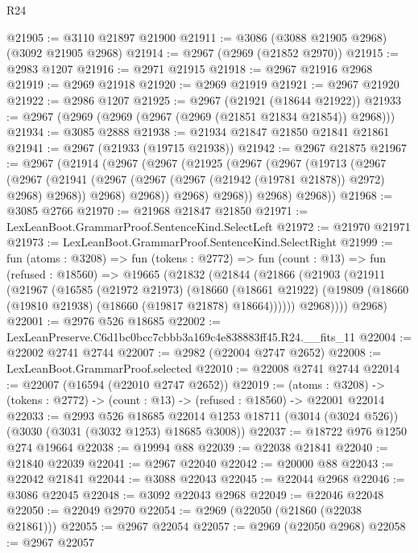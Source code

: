 \begin{lexlean}{R24}
\begin{coremodule}
@21905 := @3110 @21897 @21900
@21911 := @3086 (@3088 @21905 @2968) (@3092 @21905 @2968)
@21914 := @2967 (@2969 (@21852 @2970))
@21915 := @2983 @1207
@21916 := @2971 @21915
@21918 := @2967 @21916 @2968
@21919 := @2969 @21918
@21920 := @2969 @21919
@21921 := @2967 @21920
@21922 := @2986 @1207
@21925 := @2967 (@21921 (@18644 @21922))
@21933 := @2967 (@2969 (@2969 (@2967 (@2969 (@21851 @21834 @21854)) @2968)))
@21934 := @3085 @2888
@21938 := @21934 @21847 @21850 @21841 @21861
@21941 := @2967 (@21933 (@19715 @21938))
@21942 := @2967 @21875
@21967 := @2967
    (@21914
      (@2967
        (@2967
          (@21925
            (@2967
              (@2967
                (@19713
                  (@2967
                    (@2967
                      (@21941 (@2967 (@2967 (@2967 (@21942 (@19781 @21878)) @2972) @2968) @2968))
                      @2968)
                    @2968))
                @2968)
              @2968))
          @2968)
        @2968))
@21968 := @3085 @2766
@21970 := @21968 @21847 @21850
@21971 := LexLeanBoot.GrammarProof.SentenceKind.SelectLeft
@21972 := @21970 @21971
@21973 := LexLeanBoot.GrammarProof.SentenceKind.SelectRight
@21999 := fun (atoms : @3208) =>
  fun (tokens : @2772) =>
  fun (count : @13) =>
  fun (refused : @18560) =>
  @19665
    (@21832
      (@21844
        (@21866
          (@21903
            (@21911
              (@21967
                (@16585
                  (@21972 @21973)
                  (@18660
                    (@18661 @21922)
                    (@19809 (@18660 (@19810 @21938) (@18660 (@19817 @21878) @18664))))))
              @2968))))
      @2968)
@22001 := @2976 @526 @18685
@22002 := LexLeanPreserve.C6d1bc0bcc7cbbb3a169c4e838883ff45.R24.__fits_11
@22004 := @22002 @2741 @2744
@22007 := @2982 (@22004 @2747 @2652)
@22008 := LexLeanBoot.GrammarProof.selected
@22010 := @22008 @2741 @2744
@22014 := @22007 (@16594 (@22010 @2747 @2652))
@22019 := (atoms : @3208) ->
  (tokens : @2772) -> (count : @13) -> (refused : @18560) -> @22001 @22014
@22033 := @2993
    @526
    @18685
    @22014
    @1253
    @18711
    (@3014 (@3024 @526))
    (@3030 (@3031 (@3032 @1253) @18685 @3008))
@22037 := @18722 @976 @1250 @274 @19664
@22038 := @19994 @88
@22039 := @22038 @21841
@22040 := @21840 @22039
@22041 := @2967 @22040
@22042 := @20000 @88
@22043 := @22042 @21841
@22044 := @3088 @22043
@22045 := @22044 @2968
@22046 := @3086 @22045
@22048 := @3092 @22043 @2968
@22049 := @22046 @22048
@22050 := @22049 @2970
@22054 := @2969 (@22050 (@21860 (@22038 @21861)))
@22055 := @2967 @22054
@22057 := @2969 (@22050 @2968)
@22058 := @2967 @22057

\end{coremodule}
\end{lexlean}
